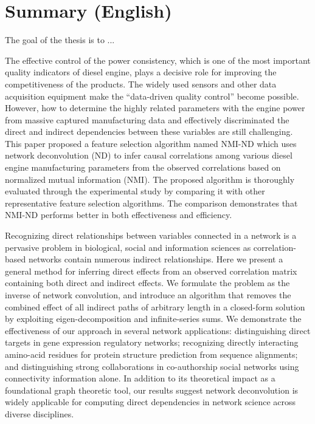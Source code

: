 \chapter{Summary (English)}

The goal of the thesis is to ...






\cite{An_effective_approach_for_causal_variables_analysis_in_diesel_engine_production_by_using_mutual_information_and_network_deconvolution}
The effective control of the power consistency, which is one of the most important quality indicators of diesel engine, plays a decisive role for improving the competitiveness of the products. The widely used sensors and other data acquisition equipment make the “data-driven quality control” become possible. However, how to determine the highly related parameters with the engine power from massive captured manufacturing data and effectively discriminated the direct and indirect dependencies between these variables are still challenging. This paper proposed a feature selection algorithm named NMI-ND which uses network deconvolution (ND) to infer causal correlations among various diesel engine manufacturing parameters from the observed correlations based on normalized mutual information (NMI). The proposed algorithm is thoroughly evaluated through the experimental study by comparing it with other representative feature selection algorithms. The comparison demonstrates that NMI-ND performs better in both effectiveness and efficiency.



\cite{Network-deconvolution-as-a-general-method-to-distinguish-direct-dependencies-in-networks}
Recognizing direct relationships between variables connected
in a network is a pervasive problem in biological, social and
information sciences as correlation-based networks contain
numerous indirect relationships. Here we present a general
method for inferring direct effects from an observed
correlation matrix containing both direct and indirect
effects. We formulate the problem as the inverse of network
convolution, and introduce an algorithm that removes the
combined effect of all indirect paths of arbitrary length in
a closed-form solution by exploiting eigen-decomposition
and infinite-series sums. We demonstrate the effectiveness
of our approach in several network applications: distinguishing
direct targets in gene expression regulatory networks; recognizing
directly interacting amino-acid residues for protein structure
prediction from sequence alignments; and distinguishing
strong collaborations in co-authorship social networks using
connectivity information alone. In addition to its theoretical
impact as a foundational graph theoretic tool, our results suggest
network deconvolution is widely applicable for computing direct
dependencies in network science across diverse disciplines.


